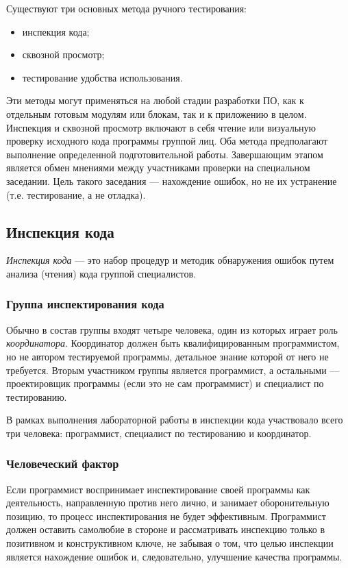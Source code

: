 \documentclass[11pt,a4paper,final]{article} %
\begin{document}
\noindent
Существуют три основных метода ручного тестирования:
\vspace{-2pt}
\begin{itemize}
	\setlength{\itemsep}{-5pt}
	\item инспекция кода;
	\item сквозной просмотр;
	\item тестирование удобства использования.
\end{itemize}

\noindent
Эти методы могут применяться на любой стадии разработки ПО, как к отдельным готовым модулям или блокам, так и к приложению в целом. \\
Инспекция и сквозной просмотр включают в себя чтение или визуальную проверку исходного кода программы группой лиц. Оба метода предполагают выполнение определенной подготовительной работы. Завершающим этапом является обмен мнениями между участниками проверки на специальном заседании. Цель такого заседания — нахождение ошибок, но не их устранение (т.е. тестирование, а не отладка).

\subsection{Инспекция кода}

\textit{Инспекция кода} — это набор процедур и методик обнаружения ошибок путем анализа (чтения) кода группой специалистов.

\subsubsection{Группа инспектирования кода}
Обычно в состав группы входят четыре человека, один из которых играет роль \textit{координатора}. Координатор должен быть квалифицированным программистом, но не автором тестируемой программы, детальное знание которой от него не требуется. Вторым участником группы является программист, а остальными — проектировщик программы (если это не сам программист) и специалист по тестированию.

В рамках выполнения лабораторной работы в инспекции кода участвовало всего три человека: программист, специалист по тестированию и координатор.

\subsubsection{Человеческий фактор}
Если программист воспринимает инспектирование своей программы как деятельность, направленную против него лично, и занимает оборонительную позицию, то процесс инспектирования не будет эффективным. Программист должен оставить самолюбие в стороне и рассматривать инспекцию только в позитивном и конструктивном ключе, не забывая о том, что целью инспекции является нахождение ошибок и, следовательно, улучшение качества программы.
\end{document}
